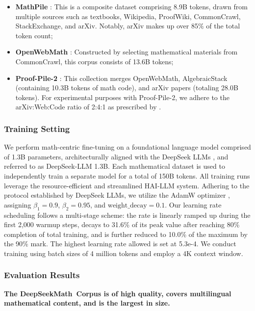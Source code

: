 \begin{itemize}[topsep=0pt]
\begin{itemize}[topsep=0pt]
    \item \textbf{MathPile} \citep{mathpile}: This is a composite dataset comprising 8.9B tokens, drawn from multiple sources such as textbooks, Wikipedia, ProofWiki, CommonCrawl, StackExchange, and arXiv. Notably, arXiv makes up over 85\% of the total token count;
    \item \textbf{OpenWebMath} \citep{openwebmath}: Constructed by selecting mathematical materials from CommonCrawl, this corpus consists of 13.6B tokens;
    \item \textbf{Proof-Pile-2} \citep{llemma}: This collection merges OpenWebMath, AlgebraicStack (containing 10.3B tokens of math code), and arXiv papers (totaling 28.0B tokens). For experimental purposes with Proof-Pile-2, we adhere to the arXiv:Web:Code ratio of 2:4:1 as prescribed by \cite{llemma}.
\end{itemize}

\subsubsection{Training Setting}
\label{sec:quality-policy}
We perform math-centric fine-tuning on a foundational language model comprised of 1.3B parameters, architecturally aligned with the DeepSeek LLMs \citep{deepseek-llm}, and referred to as DeepSeek-LLM 1.3B. Each mathematical dataset is used to independently train a separate model for a total of 150B tokens. All training runs leverage the resource-efficient and streamlined HAI-LLM \citep{haillm} system. Adhering to the protocol established by DeepSeek LLMs, we utilize the AdamW optimizer \citep{adamW}, assigning $\beta_1=0.9$, $\beta_2=0.95$, and $\mathrm{weight\_decay}=0.1$. Our learning rate scheduling follows a multi-stage scheme: the rate is linearly ramped up during the first 2,000 warmup steps, decays to 31.6\% of its peak value after reaching 80\% completion of total training, and is further reduced to 10.0\% of the maximum by the 90\% mark. The highest learning rate allowed is set at 5.3e-4. We conduct training using batch sizes of 4 million tokens and employ a 4K context window.

\subsubsection{Evaluation Results}

\textbf{The DeepSeekMath~Corpus is of high quality, covers multilingual mathematical content, and is the largest in size.}


\end{itemize}
